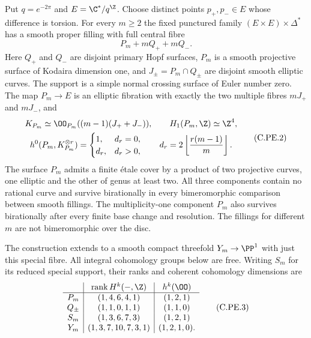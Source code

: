 
\begin{proposition}\label{cdp:st:C.2.UN.18}
Put $q=e^{-2\pi}$ and $E=\C^*/q^{\Z}$. Choose distinct
points $p_+,p_-\in E$ whose difference is torsion.
For every $m\ge2$ the fixed punctured family
$(E\times E)\times\Delta^*$ has a smooth proper filling
with full central fibre
\[
                         P_m+mQ_++mQ_-.                 \tag{C.PE.1}\label{cdp:eq:C.PE.1}
\]
Here $Q_+$ and $Q_-$ are disjoint primary Hopf surfaces,
$P_m$ is a smooth projective surface of Kodaira dimension
one, and $J_\pm=P_m\cap Q_\pm$ are disjoint smooth
elliptic curves. The support is a simple normal crossing
surface of Euler number zero. The map $P_m\to E$ is an
elliptic fibration with exactly the two multiple fibres
$mJ_+$ and $mJ_-$, and
\[
 \begin{gathered}
 K_{P_m}\simeq\OO_{P_m}((m-1)(J_++J_-)),\qquad
 H_1(P_m,\Z)\simeq\Z^4,\\
 h^0(P_m,K_{P_m}^{\otimes r})=
 \begin{cases}1,&d_r=0,\\d_r,&d_r>0,\end{cases}
 \qquad d_r=2\left\lfloor\frac{r(m-1)}m\right\rfloor.
 \end{gathered}                                         \tag{C.PE.2}\label{cdp:eq:C.PE.2}
\]
The surface $P_m$ admits a finite \'etale cover by a
product of two projective curves, one elliptic and the
other of genus at least two. All three components contain
no rational curve and survive birationally in every
bimeromorphic comparison between smooth fillings. The
multiplicity-one component $P_m$ also survives birationally
after every finite base change and resolution. The
fillings for different $m$ are not bimeromorphic over the
disc.

The construction extends to a smooth compact threefold
$Y_m\to\PP^1$ with just this special fibre. All integral
cohomology groups below are free. Writing $S_m$ for its
reduced special support, their ranks and coherent
cohomology dimensions are
\[
 \begin{array}{c|c|c}
 &\operatorname{rank}H^k(-,\Z)&h^k(\OO)\\ \hline
 P_m&(1,4,6,4,1)&(1,2,1)\\
 Q_\pm&(1,1,0,1,1)&(1,1,0)\\
 S_m&(1,3,6,7,3)&(1,2,1)\\
 Y_m&(1,3,7,10,7,3,1)&(1,2,1,0).
 \end{array}                                           \tag{C.PE.3}\label{cdp:eq:C.PE.3}
\]
\end{proposition}
